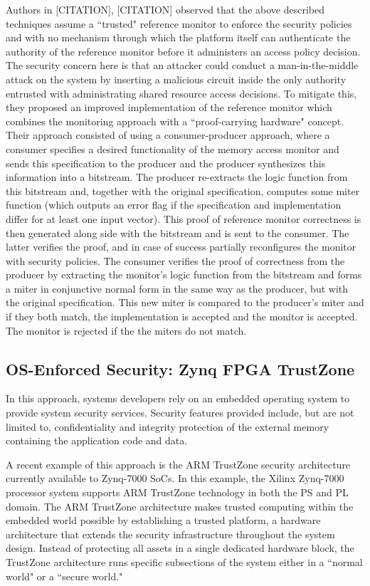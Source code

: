 \documentclass[sigconf]{acmart}
\theoremstyle{plain}
\theoremstyle{remark}
\begin{document}
Authors in [CITATION], [CITATION] observed that the above described techniques assume a ``trusted" reference monitor to enforce the security policies and with no mechanism through which the platform itself can authenticate the authority of the reference monitor before it administers an access policy decision. The security concern here is that an attacker could conduct a man-in-the-middle attack on the system by inserting a malicious circuit inside the only authority entrusted with administrating shared resource access decisions. To mitigate this, they proposed an improved implementation of the reference monitor which combines the monitoring approach with a ``proof-carrying hardware" concept. Their approach consisted of using a consumer-producer approach, where a consumer specifies a desired functionality of the memory access monitor and sends this specification to the producer and the producer synthesizes this information into a bitstream. The producer re-extracts the logic function from this bitstream and, together with the original specification, computes some miter function (which outputs an error flag if the specification and implementation differ for at least one input vector). This proof of reference monitor correctness is then generated along side with the bitstream and is sent to the consumer. The latter verifies the proof, and in case of success partially reconfigures the monitor with security policies. The consumer verifies the proof of correctness from the producer by extracting the monitor's logic function from the bitstream and forms a miter in conjunctive normal form in the same way as the producer, but with the original specification. This new miter is compared to the producer's miter and if they both match, the implementation is accepted and the monitor is accepted. The monitor is rejected if the the miters do not match.


\subsection{OS-Enforced Security: Zynq FPGA TrustZone}

In this approach, systems developers rely on an embedded operating system to provide system security services. Security features provided include, but are not limited to, confidentiality and integrity protection of the external memory containing the application code and data.

A recent example of this approach is the ARM TrustZone security architecture currently available to Zynq-7000 SoCs. In this example, the Xilinx Zynq-7000 processor system supports ARM TrustZone technology in both the PS and PL domain. The ARM TrustZone architecture makes trusted computing within the embedded world possible by establishing a trusted platform, a hardware architecture that extends the security infrastructure throughout the system design. Instead of protecting all assets in a single dedicated hardware block, the TrustZone architecture runs specific subsections of the system either in a ``normal world" or a ``secure world."
\end{document}
